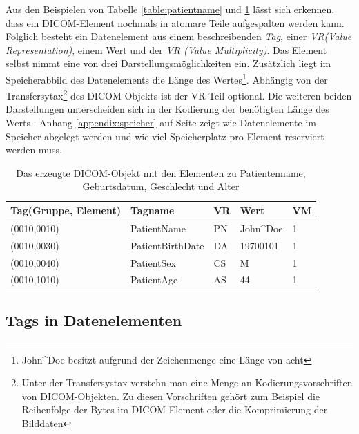 Aus den Beispielen von Tabelle \ref{table:patientname} und \ref{table:translation} lässt sich erkennen, dass ein DICOM-Element nochmals in atomare Teile aufgespalten werden kann. Folglich besteht ein Datenelement aus einem beschreibenden \textit{Tag}, einer \textit{VR(Value Representation)}, einem Wert und der \textit{VR (Value Multiplicity)}. Das Element selbst nimmt eine von drei Darstellungsmöglichkeiten ein. Zusätzlich liegt im Speicherabbild des Datenelements die Länge des Wertes\footnote{John\^{}Doe besitzt aufgrund der Zeichenmenge eine Länge von acht}. Abhängig von der Transfersytax\footnote{Unter der Transfersystax verstehn man eine Menge an Kodierungsvorschriften von DICOM-Objekten\cite[S.63 Section 10]{dicom:structure}. Zu diesen Vorschriften gehört zum Beispiel die Reihenfolge der Bytes im DICOM-Element oder die Komprimierung der Bilddaten} des DICOM-Objekts ist der VR-Teil optional. Die weiteren beiden Darstellungen unterscheiden sich in der Kodierung der benötigten Länge des Werts \cite[7.1]{dicom:structure}.  Anhang \ref{appendix:speicher} auf Seite \pageref{appendix:speicher} zeigt wie Datenelemente im Speicher abgelegt werden und wie viel Speicherplatz pro Element reserviert werden muss.

\begin{table}
    \begin{tabularx}{\textwidth}{|p{4cm}|p{4cm}|X|X|X|}
    \toprule
    \hline
    \textbf{Tag\newline \small{(Gruppe, Element)}}         & \textbf{Tagname}     & \textbf{VR} & \textbf{Wert}     	& \textbf{VM} \\ \hline
    (0010,0010) 		 & PatientName 			& PN 		  & John\^{}Doe 		& 1  \\ \hline
    (0010,0030) 		 & PatientBirthDate		& DA 		  & 19700101	 		& 1  \\ \hline
    (0010,0040)			 & PatientSex 			& CS 		  & M			 		& 1  \\ \hline
    (0010,1010) 		 & PatientAge 			& AS 		  & 44			 		& 1  \\ \hline
    \bottomrule
    \end{tabularx}
    \caption {Das erzeugte DICOM-Objekt mit den Elementen zu Patientenname, Geburtsdatum, Geschlecht und Alter}
    \label{table:translation}
\end{table}

\subsection{Tags in Datenelementen}

